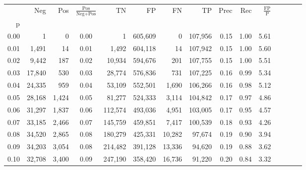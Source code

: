 \begin{tabular}{rrrcrrrrrrrrrrr}
\toprule
{} &     Neg &    Pos & $\frac{\text{Pos}}{\text{Neg}+\text{Pos}}$ &       TN &       FP &       FN &       TP &  Prec &   Rec & $\frac{\text{FP}}{\text{P}}$ \\
p    &         &        &                                            &          &          &          &          &       &       &                              \\
\midrule
0.00 &       1 &      0 &                                       0.00 &        1 &  605,609 &        0 &  107,956 &  0.15 &  1.00 &                         5.61 \\
0.01 &   1,491 &     14 &                                       0.01 &    1,492 &  604,118 &       14 &  107,942 &  0.15 &  1.00 &                         5.60 \\
0.02 &   9,442 &    187 &                                       0.02 &   10,934 &  594,676 &      201 &  107,755 &  0.15 &  1.00 &                         5.51 \\
0.03 &  17,840 &    530 &                                       0.03 &   28,774 &  576,836 &      731 &  107,225 &  0.16 &  0.99 &                         5.34 \\
0.04 &  24,335 &    959 &                                       0.04 &   53,109 &  552,501 &    1,690 &  106,266 &  0.16 &  0.98 &                         5.12 \\
0.05 &  28,168 &  1,424 &                                       0.05 &   81,277 &  524,333 &    3,114 &  104,842 &  0.17 &  0.97 &                         4.86 \\
0.06 &  31,297 &  1,837 &                                       0.06 &  112,574 &  493,036 &    4,951 &  103,005 &  0.17 &  0.95 &                         4.57 \\
0.07 &  33,185 &  2,466 &                                       0.07 &  145,759 &  459,851 &    7,417 &  100,539 &  0.18 &  0.93 &                         4.26 \\
0.08 &  34,520 &  2,865 &                                       0.08 &  180,279 &  425,331 &   10,282 &   97,674 &  0.19 &  0.90 &                         3.94 \\
0.09 &  34,203 &  3,054 &                                       0.08 &  214,482 &  391,128 &   13,336 &   94,620 &  0.19 &  0.88 &                         3.62 \\
0.10 &  32,708 &  3,400 &                                       0.09 &  247,190 &  358,420 &   16,736 &   91,220 &  0.20 &  0.84 &                         3.32 \\

\end{tabular}

